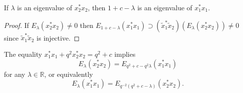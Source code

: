 \begin{corollary}\label{eigenvalue} If $\lambda$ is an eigenvalue of $x_{2}^{\ast}x_{2}$,
then $1+c-\lambda$ is an eigenvalue of $x_{1}^{\ast}x_{1}$.
\end{corollary}
\begin{proof} If $E_{\lambda}( x_{2}^{\ast}x_{2}) \neq0$ then
$E_{1+c-\lambda}( x_{1}^{\ast}x_{1}) \supset( \tilde{x}%
_{1}^{\ast}\tilde{x}_{2}) ( E_{\lambda}( x_{2}^{\ast}%
x_{2}) ) \neq0$ since $\tilde{x}_{1}^{\ast}\tilde{x}_{2}$ is injective.
\end{proof}

The equality $x_{1}^{\ast}x_{1}+q^{2}x_{2}^{\ast}x_{2}=q^{2}+c$ implies
\[
E_{\lambda}( x_{2}^{\ast}x_{2}) =E_{q^{2}+c-q^{2}\lambda}(
x_{1}^{\ast}x_{1})
\]
for any $\lambda\in\mathbb{R}$, or equivalently
\[
E_{\lambda}( x_{1}^{\ast}x_{1}) =E_{q^{-2}( q^{2}%
+c-\lambda) }( x_{2}^{\ast}x_{2}) .
\]

